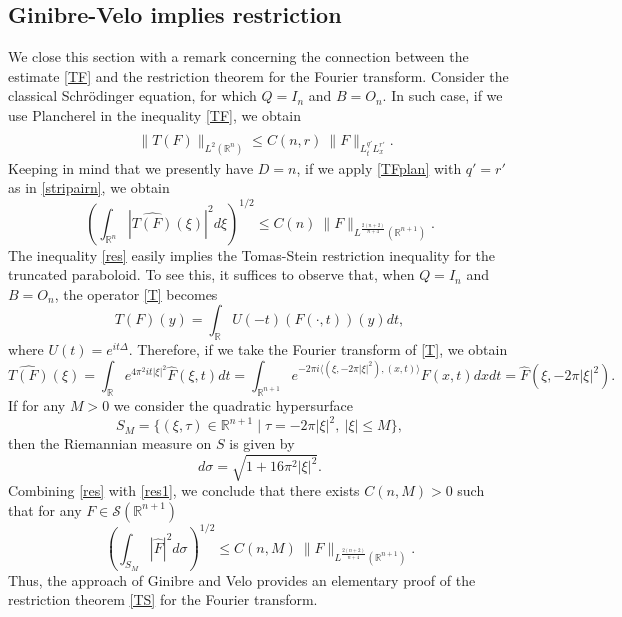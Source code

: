 \documentclass[11pt,letter]{amsart}
\def \R {\mathbb{R}}
\newcommand{\Rn}{\mathbb R^n}
\numberwithin{equation}{section}
\newcommand{\sa}{\langle}
\newcommand{\da}{\rangle}
\numberwithin{equation}{section}
\begin{document}
\subsection{Ginibre-Velo implies restriction}\label{S:res} We close this section with a remark concerning the connection between the  estimate \eqref{TF} and the restriction theorem for the Fourier transform. Consider the classical Schr\"odinger equation, for which $Q = I_n$ and $B = O_n$. In such case, if we use Plancherel in the inequality \eqref{TF}, we obtain 
\begin{align}\label{TFplan}
& \|\widehat{T(F)}\|_{L^2(\Rn)} \le C(n,r)\ \|F\|_{L^{q'}_t L^{r'}_x}.	
\end{align}
Keeping in mind that we presently have $D=n$,  if we apply \eqref{TFplan} with $q' = r'$ as in \eqref{stripairn}, we obtain
\begin{equation}\label{res}
\left(\int_{\Rn} |\widehat{T(F)}(\xi)|^2 d\xi\right)^{1/2} \le C(n)\ \|F\|_{L^{\frac{2(n+2)}{n+4}}(\R^{n+1})}.
\end{equation}
The inequality \eqref{res} easily implies the Tomas-Stein restriction inequality for the truncated paraboloid. To see this, it suffices to observe that, when $Q = I_n$ and $B = O_n$, the operator \eqref{T} becomes
\[
T(F)(y) = \int_\R U(-t)(F(\cdot,t))(y) dt,
\]
where $U(t) = e^{it\Delta}$. Therefore, 
if we take the Fourier transform of \eqref{T}, we obtain
\begin{equation}\label{res1}
\widehat{T(F)}(\xi) = \int_\R e^{4\pi^2 i t |\xi|^2} \hat F(\xi,t) dt =  \int_{\R^{n+1}} e^{-2\pi i\sa(\xi,-2\pi |\xi|^2),(x,t)\da} F(x,t) dx dt = \hat F(\xi,-2\pi|\xi|^2).
\end{equation}
If for any $M>0$ we consider the quadratic hypersurface
\[
S_M = \{(\xi,\tau)\in\R^{n+1}\mid \tau = - 2\pi |\xi|^2,\ |\xi|\le M\},
\]
then the Riemannian measure on $S$ is given by
\[
d\sigma = \sqrt{1+16\pi^2 |\xi|^2}.
\]
Combining \eqref{res} with \eqref{res1}, we conclude that 
there exists $C(n,M)>0$ such that for any $F\in \mathscr S(\R^{n+1})$
\begin{equation}\label{TS}
\left(\int_{S_M} |\hat F|^2 d\sigma\right)^{1/2} \le C(n,M)\ \|F\|_{L^{\frac{2(n+2)}{n+4}}(\R^{n+1})}.
\end{equation}
Thus, the approach of Ginibre and Velo provides an elementary proof of the restriction theorem \eqref{TS} for the Fourier transform. 


  
 
\end{document}
